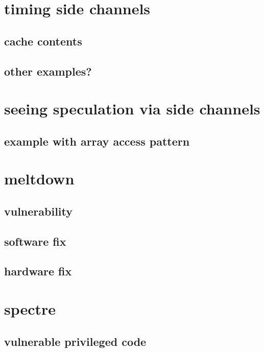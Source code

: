 \date{}
\title{}
\date{}

\begin{frame}
    \titlepage
\end{frame}

\section{timing side channels}

\subsection{cache contents}

\subsection{other examples?}

\section{seeing speculation via side channels}

\subsection{example with array access pattern}

\section{meltdown}

\subsection{vulnerability}

\subsection{software fix}

\subsection{hardware fix}

\section{spectre}

\subsection{vulnerable privileged code}

